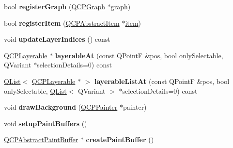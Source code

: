 \begin{DoxyCompactItemize}
\item 
\mbox{\label{class_q_custom_plot_acfc01230bddaea4f1782e4aa7d130af6}} 
bool {\bfseries register\+Graph} (\hyperlink{class_q_c_p_graph}{Q\+C\+P\+Graph} $\ast$\hyperlink{class_q_custom_plot_a6ecae130f684b25276fb47bd3a5875c6}{graph})
\item 
\mbox{\label{class_q_custom_plot_afbd4010b2e3f364c8d512691b2a1640a}} 
bool {\bfseries register\+Item} (\hyperlink{class_q_c_p_abstract_item}{Q\+C\+P\+Abstract\+Item} $\ast$\hyperlink{class_q_custom_plot_ac042f2e78edd228ccf2f26b7fe215239}{item})
\item 
\mbox{\label{class_q_custom_plot_a7f1ca67a66d37b6d260a0b93de08f3bd}} 
void {\bfseries update\+Layer\+Indices} () const
\item 
\mbox{\label{class_q_custom_plot_a12536fa6d5deb34ec620acb5134ca82a}} 
\hyperlink{class_q_c_p_layerable}{Q\+C\+P\+Layerable} $\ast$ {\bfseries layerable\+At} (const Q\+PointF \&pos, bool only\+Selectable, Q\+Variant $\ast$selection\+Details=0) const
\item 
\mbox{\label{class_q_custom_plot_ac9048589e78e7959d27a2c48c253e159}} 
\hyperlink{class_q_list}{Q\+List}$<$ \hyperlink{class_q_c_p_layerable}{Q\+C\+P\+Layerable} $\ast$ $>$ {\bfseries layerable\+List\+At} (const Q\+PointF \&pos, bool only\+Selectable, \hyperlink{class_q_list}{Q\+List}$<$ Q\+Variant $>$ $\ast$selection\+Details=0) const
\item 
\mbox{\label{class_q_custom_plot_a05dd52438cee4353b18c1e53a439008d}} 
void {\bfseries draw\+Background} (\hyperlink{class_q_c_p_painter}{Q\+C\+P\+Painter} $\ast$painter)
\item 
\mbox{\label{class_q_custom_plot_a2685341f7242c3882f4cc5e379308d71}} 
void {\bfseries setup\+Paint\+Buffers} ()
\item 
\mbox{\label{class_q_custom_plot_a943b57596a1adf7f0e75c3b50e407ae6}} 
\hyperlink{class_q_c_p_abstract_paint_buffer}{Q\+C\+P\+Abstract\+Paint\+Buffer} $\ast$ {\bfseries create\+Paint\+Buffer} ()
\item 

\end{DoxyCompactItemize}
